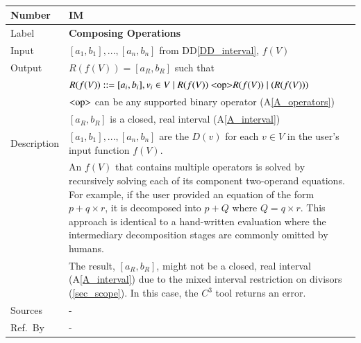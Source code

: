 \documentclass[12pt]{article}
\newcommand{\colAwidth}{0.13\textwidth}
\newcommand{\colBwidth}{0.82\textwidth}
\newcommand{\ddref}[1]{DD\ref{#1}}
\newcommand{\aref}[1]{A\ref{#1}}
\newcounter{instnum} %
\newcommand{\prognameAbbrv}{$C^{3}$}
\begin{document}
~\newline

\noindent
\begin{minipage}{\textwidth}
	\renewcommand*{\arraystretch}{1.5}
	\begin{tabular}{| p{\colAwidth} | p{\colBwidth}|}
		\hline
		\rowcolor[gray]{0.9}
		Number& IM{instnum}\theinstnum \label{I_compose}\\
		\hline
		Label& \bf Composing Operations\\
		\hline
		Input&$[a_{1}, b_{1}], ..., [a_{n}, b_{n}]$ from \ddref{DD_interval}, 
		$f(V)$\\
		\hline
		Output&$R(f(V)) = [a_{R}, b_{R}]$ such that\\
		& $R(f(V)) ::= [a_i, b_i], v_i \in V \mid R(f(V)) 
		\text{ \textless op\textgreater} R(f(V)) \mid ( R(f(V)) )$\\
		&$\text{\textless op\textgreater}$ can be any supported binary 
		operator (\aref{A_operators})\\
		&$[a_{R}, b_{R}]$ is a closed, real interval (\aref{A_interval})\\
		\hline
		Description&$[a_{1}, b_{1}], ..., [a_{n}, b_{n}]$ are the $D(v)$ for 
		each $v \in V$ in the user's input function $f(V)$. \\
		&An $f(V)$ that contains multiple operators is solved by recursively 
		solving each of its component two-operand equations. For example, if 
		the user provided an equation of the form $p + q \times r$, it is 
		decomposed into $p + Q$ where $Q = q \times r$. This approach is 
		identical to a hand-written evaluation where the intermediary 
		decomposition stages are commonly omitted by humans. 
		\\
		&The result, $[a_{R}, b_{R}]$, might not be 
		a closed, real interval (\aref{A_interval}) due to the mixed interval 
		restriction on divisors (\ref{sec_scope}). In this case, the 
		\prognameAbbrv{} tool returns an error.
		\\
		\hline
		Sources& - \\
		\hline
		Ref.\ By & -\\
		\hline
	\end{tabular}
\end{minipage}\\
\end{document}
